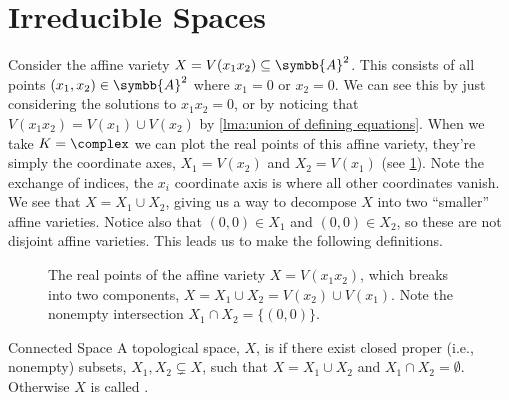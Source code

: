 \documentclass[fleqn]{NotesClass}
\newcommand{\affine}{\symbb{A}}
\begin{document}
    \section{Irreducible Spaces}
    Consider the affine variety \(X = V(x_1x_2) \subseteq \affine^2\).
    This consists of all points \((x_1, x_2) \in \affine^2\) where \(x_1 = 0\) or \(x_2 = 0\).
    We can see this by just considering the solutions to \(x_1x_2 = 0\), or by noticing that \(V(x_1x_2) = V(x_1) \cup V(x_2)\) by \cref{lma:union of defining equations}.
    When we take \(K = \complex\) we can plot the real points of this affine variety, they're simply the coordinate axes, \(X_1 = V(x_2)\) and \(X_2 = V(x_1)\) (see \cref{fig:affine variety coordinate axes}).
    Note the exchange of indices, the \(x_i\) coordinate axis is where all other coordinates vanish.
    We see that \(X = X_1 \cup X_2\), giving us a way to decompose \(X\) into two \enquote{smaller} affine varieties.
    Notice also that \((0, 0) \in X_1\) and \((0, 0) \in X_2\), so these are not disjoint affine varieties.
    This leads us to make the following definitions.
    
    \begin{figure}
        \centering
        \caption[The affine variety \(X = V(x_1x_2)\).]{The real points of the affine variety \(X = V(x_1 x_2)\), which breaks into two components, \(X = X_1 \cup X_2 = V(x_2) \cup V(x_1)\). Note the nonempty intersection \(X_1 \cap X_2 = \{(0, 0)\}\).}
        \label{fig:affine variety coordinate axes}
    \end{figure}
    
    \begin{dfn}{Connected Space}{}
        A topological space, \(X\), is  if there exist closed proper (i.e., nonempty) subsets, \(X_1, X_2 \subsetneq X\), such that \(X = X_1 \cup X_2\) and \(X_1 \cap X_2 = \emptyset\).
        Otherwise \(X\) is called .
    \end{dfn}
    
\end{document}
